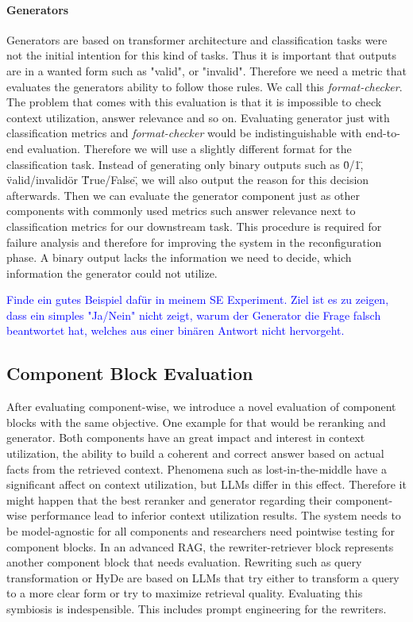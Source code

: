 \paragraph{Generators}
Generators are based on transformer architecture and classification tasks were not the initial intention for this kind of tasks. Thus it is important that outputs are in a wanted form such as "valid", or "invalid". Therefore we need a metric that evaluates the generators ability to follow those rules. We call this \textit{format-checker}. The problem that comes with this evaluation is that it is impossible to check context utilization, answer relevance and so on. Evaluating generator just with classification metrics and \textit{format-checker} would be indistinguishable with end-to-end evaluation. Therefore we will use a slightly different format for the classification task. Instead of generating only binary outputs such as \"0/1\", \"valid/invalid\" or \"True/False\", we will also output the reason for this decision afterwards. Then we can evaluate the generator component just as other components with commonly used metrics such answer relevance next to classification metrics for our downstream task. This procedure is required for failure analysis and therefore for improving the system in the reconfiguration phase. A binary output lacks the information we need to decide, which information the generator could not utilize. 

\textcolor{blue}{Finde ein gutes Beispiel dafür in meinem SE Experiment. Ziel ist es zu zeigen, dass ein simples "Ja/Nein" nicht zeigt, warum der Generator die Frage falsch beantwortet hat, welches aus einer binären Antwort nicht hervorgeht.}


\subsection{Component Block Evaluation}

After evaluating component-wise, we introduce a novel evaluation of component blocks with the same objective. One example for that would be reranking and generator. Both components have an great impact and interest in context utilization, the ability to build a coherent and correct answer based on actual facts from the retrieved context. Phenomena such as lost-in-the-middle have a significant affect on context utilization, but LLMs differ in this effect.\cite{Liu.06.07.2023} Therefore it might happen that the best reranker and generator regarding their component-wise performance lead to inferior context utilization results. The system needs to be model-agnostic for all components and researchers need pointwise testing for component blocks. In an advanced RAG, the rewriter-retriever block represents another component block that needs evaluation. Rewriting such as query transformation or HyDe are based on LLMs that try either to transform a query to a more clear form or try to maximize retrieval quality. Evaluating this symbiosis is indespensible. This includes prompt engineering for the rewriters.

